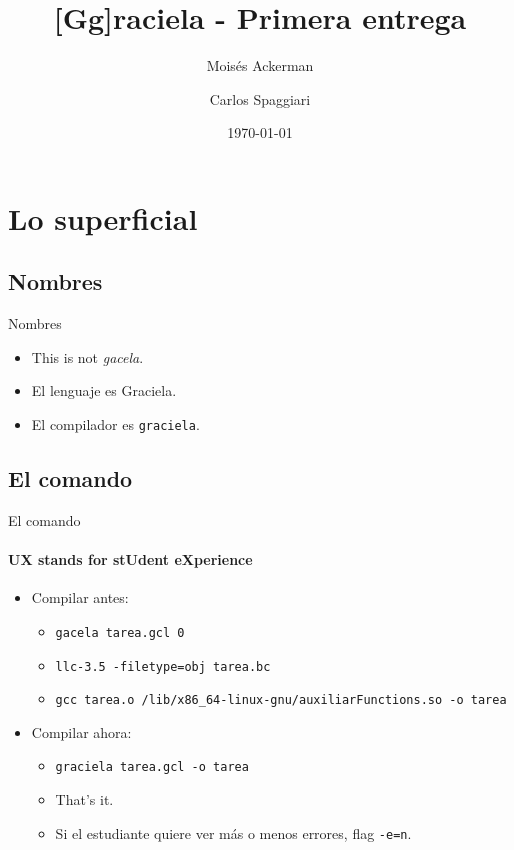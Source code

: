 \documentclass{beamer}
\title[Graciela]{[Gg]raciela - Primera entrega}
\author[Ackerman - Spaggiari]{Moisés Ackerman \and Carlos Spaggiari}
\institute[USB]{Universidad Simón Bolívar}
\date{\today{}}
\begin{document}
\begin{frame}
  \titlepage
\end{frame}

\section{Lo superficial}
\subsection{Nombres}
\begin{frame}{Nombres}
\begin{itemize}
  \item This is not \textit{gacela}.
  \item El lenguaje es Graciela.
  \item El compilador es \texttt{graciela}.
\end{itemize}
\end{frame}

\subsection{El comando}
\begin{frame}{El comando}
\framesubtitle{UX stands for stUdent eXperience}
\begin{itemize}
  \item Compilar antes: \begin{itemize}
    \item\texttt{gacela tarea.gcl 0}
    \item\texttt{llc-3.5 -filetype=obj tarea.bc}
    \item\texttt{gcc tarea.o /lib/x86\_64-linux-gnu/auxiliarFunctions.so -o tarea}
  \end{itemize}
   \item Compilar ahora: \begin{itemize}
    \item\texttt{graciela tarea.gcl -o tarea}
    \item That's it.
    \item Si el estudiante quiere ver más o menos errores, flag \texttt{-e=n}.
  \end{itemize}
\end{itemize}
\end{frame}
\end{document}
